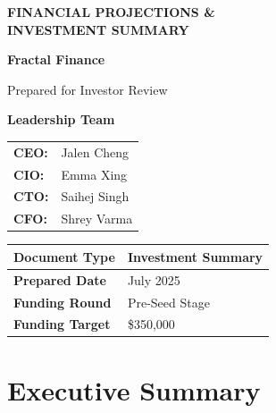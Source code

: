 \documentclass[11pt,letterpaper]{article}
\begin{document}
\begin{titlepage}
\centering
\vspace*{2cm}

{\Huge\bfseries\color{primaryblue} FINANCIAL PROJECTIONS \& \\[0.3cm] INVESTMENT SUMMARY}

\vspace{1.5cm}

{\Large\textbf{Fractal Finance}}

\vspace{1cm}

{\large Prepared for Investor Review}

\vspace{1.5cm}

\begin{center}
\textbf{\large Leadership Team}

\vspace{0.5cm}

\begin{tabular}{ll}
\textbf{CEO:} & Jalen Cheng \\[0.2cm]
\textbf{CIO:} & Emma Xing \\[0.2cm]
\textbf{CTO:} & Saihej Singh \\[0.2cm]
\textbf{CFO:} & Shrey Varma \\
\end{tabular}
\end{center}

\vspace{2cm}

\begin{tabular}{|l|l|}
\hline
\textbf{Document Type} & Investment Summary\\
\hline
\textbf{Prepared Date} & July 2025 \\
\hline
\textbf{Funding Round} & Pre-Seed Stage \\
\hline
\textbf{Funding Target} & \$350,000\\
\hline
\end{tabular}

\vfill

\end{titlepage}

\tableofcontents
\newpage

\section{Executive Summary}
\end{document}

